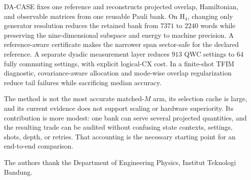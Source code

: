 \documentclass[aps,pra,reprint,superscriptaddress,nofootinbib,floatfix]{revtex4-2}
\begin{document}
DA-CASE fixes one reference and reconstructs projected overlap, Hamiltonian,
and observable matrices from one reusable Pauli bank.  On H$_4$, changing only
generator resolution reduces the retained bank from \(7371\) to \(2240\)
words while preserving the nine-dimensional subspace and energy to machine
precision.  A reference-aware certificate makes the narrower span
sector-safe for the declared reference.  A separate dyadic measurement layer
reduces \(913\) QWC settings to \(64\) fully commuting settings, with explicit
logical-CX cost.  In a finite-shot TFIM diagnostic, covariance-aware
allocation and mode-wise overlap regularization reduce tail failures while
sacrificing median accuracy.

The method is not the most accurate matched-\(M\) arm, its selection cache is
large, and its current evidence does not support scaling or hardware
superiority.  Its contribution is more modest: one bank can serve several
projected quantities, and the resulting trade can be audited without confusing
state contexts, settings, shots, depth, or retries.  That accounting is the
necessary starting point for an end-to-end comparison.

\begin{acknowledgments}
The authors thank the Department of Engineering Physics, Institut Teknologi
Bandung.
\end{acknowledgments}



\end{document}
